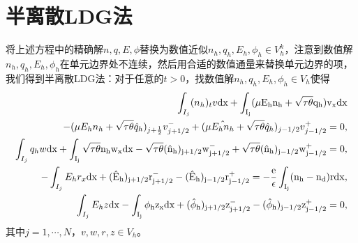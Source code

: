 \documentclass[lang=cn,newtx,10pt,scheme=chinese]{elegantbook}
\begin{document}
\section{半离散LDG法}
将上述方程中的精确解$n,q,E,\phi$替换为数值近似$n_h,q_h,E_h,\phi_h \in V_h^k$，注意到数值解$n_h,q_h,E_h,\phi_h$在单元边界处不连续，然后用合适的数值通量来替换单元边界的项，我们得到半离散LDG法：对于任意的$t>0$，找数值解$n_h,q_h,E_h,\phi_h \in V_h$使得
\begin{align}
    \int_{I_j} (n_h)_t v \rm{d}x + \int_{I_j}(\mu E_h n_h + \sqrt{\tau \theta}q_h)v_x\rm{d} x                                                               \nonumber                                 \\
    - (\mu E_hn_h + \sqrt{\tau \theta}\hat{q}_h)_{j+\frac{1}{2}}v_{j+1/2}^- +(\mu \hat{E_hn_h} + \sqrt{\tau \theta}\hat{q}_h)_{j-1/2}v_{j-1/2}^+ = 0,                                   \label{LDG:1} \\
    \int_{I_j} q_hw \rm{d}x + \int_{I_j}\sqrt{\tau \theta} n_h w_x \rm{d}x - \sqrt{\tau \theta} (\hat{n}_h)_{j+1/2}w_{j+1/2}^- + \sqrt{\tau \theta} (\hat{n}_h)_{j-1/2}w_{j-1/2}^+ = 0, \label{LDG:2} \\
    -\int_{I_j}E_hr_x\rm{d}x + (\hat{E}_h)_{j+1/2}r_{j+1/2}^- - (\hat{E}_h)_{j-1/2}r_{j-1/2}^+ = -\frac{e}{\epsilon}\int_{I_j}(n_h-n_d)r\rm{d}x,                                        \label{LDG:3} \\
    \int_{I_j} E_hz \rm{d}x - \int_{I_j}\phi_h z_x \rm{d}x + (\hat{\phi}_h)_{j+1/2}z_{j+1/2}^- - (\hat{\phi}_h)_{j-1/2}z_{j-1/2}^+ = 0,\label{LDG:4}
\end{align}
其中$ j=1,\cdots,N$，$v,w,r,z \in V_h$。
\end{document}
